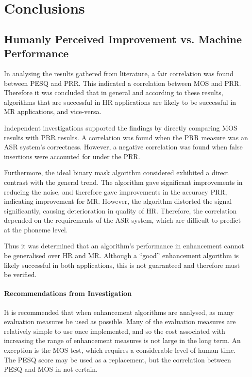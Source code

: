 
\chapter{Conclusions}

\acresetall


\section{Humanly Perceived Improvement vs. Machine Performance}

In analysing the results gathered from literature, a fair correlation
was found between \ac{PESQ} and \ac{PRR}. This indicated a correlation
between \ac{MOS} and \ac{PRR}. Therefore it was concluded that in
general and according to these results, algorithms that are successful
in \ac{HR} applications are likely to be successful in \ac{MR} applications,
and vice-versa.

Independent investigations supported the findings by directly comparing
\ac{MOS} results with \ac{PRR} results. A correlation was found
when the \ac{PRR} measure was an \ac{ASR} system's correctness.
However, a negative correlation was found when false insertions were
accounted for under the \ac{PRR}.

Furthermore, the ideal binary mask algorithm considered exhibited
a direct contrast with the general trend. The algorithm gave significant
improvements in reducing the noise, and therefore gave improvements
in the accuracy \ac{PRR}, indicating improvement for \ac{MR}. However,
the algorithm distorted the signal significantly, causing deterioration
in quality of \ac{HR}. Therefore, the correlation depended on the
requirements of the \ac{ASR} system, which are difficult to predict
at the phoneme level.

Thus it was determined that an algorithm's performance in enhancement
cannot be generalised over \ac{HR} and \ac{MR}. Although a ``good''
enhancement algorithm is likely successful in both applications, this
is not guaranteed and therefore must be verified.


\subsubsection*{Recommendations from Investigation}

It is recommended that when enhancement algorithms are analysed, as
many evaluation measures be used as possible. Many of the evaluation
measures are relatively simple to use once implemented, and so the
cost associated with increasing the range of enhancement measures
is not large in the long term. An exception is the \ac{MOS} test,
which requires a considerable level of human time. The \ac{PESQ}
score may be used as a replacement, but the correlation between \ac{PESQ}
and \ac{MOS} in not certain.

